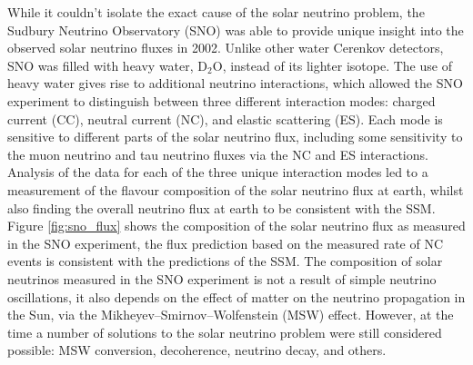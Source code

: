 While it couldn't isolate the exact cause of the solar neutrino problem, the
Sudbury Neutrino Observatory (SNO) was able to provide unique insight into the 
observed solar neutrino fluxes in 2002. Unlike other water Cerenkov detectors, 
SNO was filled with heavy water, \(\mbox{D}_2\mbox{O}\), instead of its 
lighter isotope. The use of heavy water gives rise to additional neutrino 
interactions, which allowed the SNO experiment to distinguish between three 
different interaction modes: charged current (CC), neutral current (NC), and 
elastic scattering (ES). Each mode is sensitive to different parts of the 
solar neutrino flux, including some sensitivity to the muon neutrino and tau 
neutrino fluxes via the NC and ES interactions. Analysis of the data for each 
of the three unique interaction modes led to a measurement of the flavour 
composition of the solar neutrino flux at earth, whilst also finding the 
overall neutrino flux at earth to be consistent with the SSM.  Figure 
\ref{fig:sno_flux} shows the composition of the solar neutrino flux as 
measured in the SNO experiment\cite{Ahmad2002}, the flux prediction based on 
the measured rate of NC events is consistent with the predictions of the SSM. 
The composition of solar neutrinos measured in the SNO experiment is not a 
result of simple neutrino oscillations, it also depends on the effect of matter 
on the neutrino propagation in the Sun, via the Mikheyev–Smirnov–Wolfenstein 
(MSW) effect. However, at the time a number of solutions to the solar neutrino
problem were still considered possible: MSW conversion, decoherence, neutrino 
decay, and others\cite{Smirnov:2016xzf}. 

